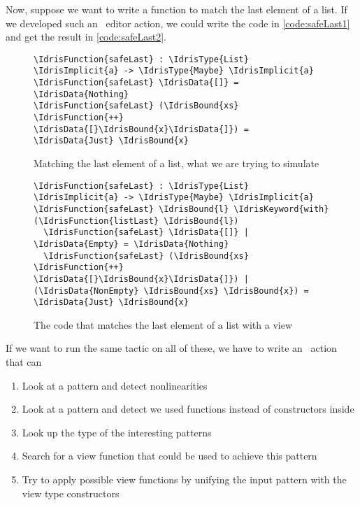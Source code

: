 Now, suppose we want to write a function to match the last element of a list.
If we developed such an \Elab\ editor action, we could write the code in
\autoref{code:safeLast1} and get the result in \autoref{code:safeLast2}.

\begin{figure}[ht]
\caption{Matching the last element of a list, what we are trying to simulate}
\label{code:safeLast1}
\begin{Verbatim}[framesep=2mm, label=\footnotesize{\normalfont{Idris}}, labelposition=topline]
\IdrisFunction{safeLast} : \IdrisType{List} \IdrisImplicit{a} -> \IdrisType{Maybe} \IdrisImplicit{a}
\IdrisFunction{safeLast} \IdrisData{[]} = \IdrisData{Nothing}
\IdrisFunction{safeLast} (\IdrisBound{xs} \IdrisFunction{++} \IdrisData{[}\IdrisBound{x}\IdrisData{]}) = \IdrisData{Just} \IdrisBound{x}
\end{Verbatim}
\end{figure}

\begin{figure}[ht]
\caption{The code that matches the last element of a list with a view}
\label{code:safeLast2}
\begin{Verbatim}[framesep=2mm, label=\footnotesize{\normalfont{Idris}}, labelposition=topline]
\IdrisFunction{safeLast} : \IdrisType{List} \IdrisImplicit{a} -> \IdrisType{Maybe} \IdrisImplicit{a}
\IdrisFunction{safeLast} \IdrisBound{l} \IdrisKeyword{with} (\IdrisFunction{listLast} \IdrisBound{l})
  \IdrisFunction{safeLast} \IdrisData{[]} | \IdrisData{Empty} = \IdrisData{Nothing}
  \IdrisFunction{safeLast} (\IdrisBound{xs} \IdrisFunction{++} \IdrisData{[}\IdrisBound{x}\IdrisData{]}) | (\IdrisData{NonEmpty} \IdrisBound{xs} \IdrisBound{x}) = \IdrisData{Just} \IdrisBound{x}
\end{Verbatim}
\end{figure}

If we want to run the same tactic on all of these, we have to write an \Elab\ action
that can
\begin{enumerate}
\item Look at a pattern and detect nonlinearities
\item Look at a pattern and detect we used functions instead of constructors inside
\item Look up the type of the interesting patterns
\item Search for a view function that could be used to achieve this pattern
\item Try to apply possible view functions by unifying the input pattern with the view type constructors
\end{enumerate}

